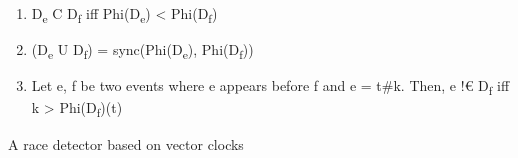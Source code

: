 \documentclass[landscape, a4paper]{article}
\begin{document}
\begin{minipage}[t]{0.19\linewidth}
\begin{betterlist}
\begin{betterlist}
\begin{betterlist}
			\end{betterlist}
			\item {}
			\begin{enumerate}
				\item D\textsubscript{e} C D\textsubscript{f} iff Phi(D\textsubscript{e}) < Phi(D\textsubscript{f})
				\item (D\textsubscript{e} U D\textsubscript{f}) = sync(Phi(D\textsubscript{e}), Phi(D\textsubscript{f}))
				\item Let e, f be two events where e appears before f and e = t\#k. Then, e !€ D\textsubscript{f} iff k > Phi(D\textsubscript{f})(t)
			\end{enumerate}
		\end{betterlist}
		\item {} A race detector based on vector clocks
		\vspace{-0.25cm}


\end{betterlist}
\end{minipage}
\end{document}
